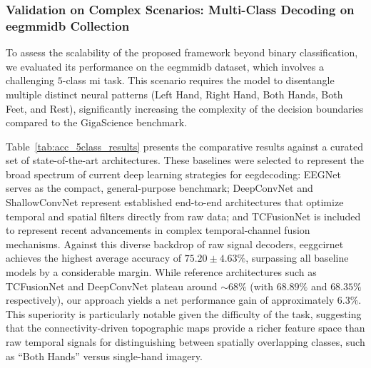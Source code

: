 \subsubsection{Validation on Complex Scenarios: Multi-Class Decoding on \gls{eegmmidb} Collection}

{To assess the scalability of the proposed framework beyond binary classification, we evaluated its performance on the \gls{eegmmidb} dataset, which involves a challenging $5$-class \gls{mi} task. This scenario requires the model to disentangle multiple distinct neural patterns (Left Hand, Right Hand, Both Hands, Both Feet, and Rest), significantly increasing the complexity of the decision boundaries compared to the GigaScience benchmark.}

{Table~\ref{tab:acc_5class_results} presents the comparative results against a curated set of state-of-the-art architectures. These baselines were selected to represent the broad spectrum of current deep learning strategies for \gls{eeg}decoding: {EEGNet} serves as the compact, general-purpose benchmark; {DeepConvNet} and {ShallowConvNet} represent established end-to-end architectures that optimize temporal and spatial filters directly from raw data; and {TCFusionNet} is included to represent recent advancements in complex temporal-channel fusion mechanisms. Against this diverse backdrop of raw signal decoders, \gls{eeggcirnet} achieves the highest average accuracy of $75.20 \pm 4.63\%$, surpassing all baseline models by a considerable margin. While reference architectures such as TCFusionNet and DeepConvNet plateau around $\sim 68\%$ (with $68.89\%$ and $68.35\%$ respectively), our approach yields a net performance gain of approximately $6.3\%$. This superiority is particularly notable given the difficulty of the task, suggesting that the connectivity-driven topographic maps provide a richer feature space than raw temporal signals for distinguishing between spatially overlapping classes, such as ``Both Hands'' versus single-hand imagery.}

